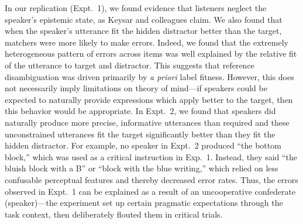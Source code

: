 \documentclass[10pt,letterpaper]{article}
\begin{document}
In our replication (Expt.~1), we found evidence that listeners neglect the speaker's epistemic state, as Keysar and colleagues claim.
We also found that when the speaker's utterance fit the hidden distractor better than the target, matchers were more likely to make errors. 
Indeed, we found that the extremely heterogeneous pattern of errors across items was well explained by the relative fit of the utterance to target and distractor.
This suggests that reference disambiguation was driven primarily by \emph{a priori} label fitness. 
%
However, this does not necessarily imply limitations on theory of mind---if speakers could be expected to naturally provide expressions which apply better to the target, then this behavior would be appropriate.
In Expt.~2, we found that speakers did naturally produce more precise, informative utterances than required and these unconstrained utterances fit the target significantly better than they fit the hidden distractor. 
For example, no speaker in Expt.~2 produced ``the bottom block,'' which was used as a critical instruction in Exp.~1. Instead, they said ``the bluish block with a B'' or ``block with the blue writing,'' which relied on less confusable perceptual features and thereby decreased error rates. 
Thus, the errors observed in Expt.~1 can be explained as a result of an uncooperative confederate (speaker)---the experiment set up certain pragmatic expectations through the task context, then deliberately flouted them in critical trials. %
\end{document}

